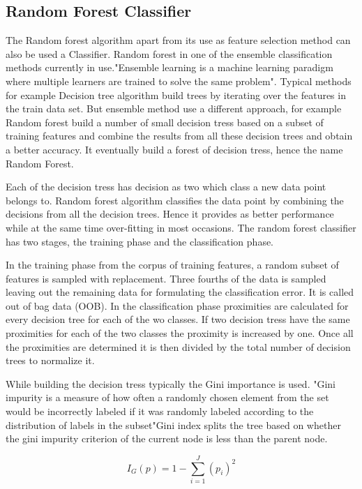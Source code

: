 \documentclass[sigconf]{acmart}
\begin{document}
\subsection{Random Forest Classifier}
The Random forest algorithm apart from its use as feature selection method can also be used a Classifier. Random forest in one of the ensemble classification methods currently in use."Ensemble learning is a machine learning paradigm where multiple learners are trained to solve the same problem"\cite{}. Typical methods for example Decision tree algorithm build trees by iterating over the  features in the train data set. But ensemble method use a different approach, for example Random forest build a number of small decision tress based on a subset of training features and combine the results from all these decision trees and obtain a better accuracy. It eventually build a forest of decision tress, hence the name Random Forest.

Each of the decision tress has decision as two which class a new data point belongs to. Random forest algorithm classifies the data point by combining the decisions from all the decision trees. Hence it provides as better performance while at the same time over-fitting in most occasions. The random forest classifier has two stages, the training phase and the classification phase. 

In the training phase from the corpus of training features, a random subset of features is sampled with replacement. Three fourths of the data is sampled leaving out the remaining data for formulating the classification error. It is called out of bag data (OOB). In the classification phase proximities are calculated for every decision tree for each of the wo classes. If two decision tress have the same proximities for each of the two classes the proximity is increased by one. Once all the proximities are determined it is then divided by the total number of decision trees to normalize it.

While building the decision tress typically the Gini importance is used. "Gini impurity is a measure of how often a randomly chosen element from the set would be incorrectly labeled if it was randomly labeled according to the distribution of labels in the subset\cite{wiki}"Gini index splits the tree based on whether the gini impurity criterion of the current node is less than the parent node.

\begin{equation}
    I_G(p) = 1-\sum_{i=1}^{J} (p_i)^2
\end{equation}\\
\end{document}

